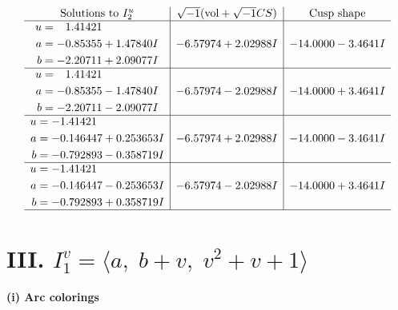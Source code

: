 \documentclass[1p]{elsarticle_modified}
\theoremstyle{definition}
\newcommand{\I}{\sqrt{-1}}
\begin{document}
$$\begin{array}{c|c|c}  
\text{Solutions to }I^u_{2}& \I (\text{vol} + \sqrt{-1}CS) & \text{Cusp shape}\\
 \hline 
\begin{aligned}
u &= \phantom{-}1.41421\phantom{ +0.000000I} \\
a &= -0.85355 + 1.47840 I \\
b &= -2.20711 + 2.09077 I\end{aligned}
 & -6.57974 + 2.02988 I & -14.0000 - 3.4641 I \\ \hline\begin{aligned}
u &= \phantom{-}1.41421\phantom{ +0.000000I} \\
a &= -0.85355 - 1.47840 I \\
b &= -2.20711 - 2.09077 I\end{aligned}
 & -6.57974 - 2.02988 I & -14.0000 + 3.4641 I \\ \hline\begin{aligned}
u &= -1.41421\phantom{ +0.000000I} \\
a &= -0.146447 + 0.253653 I \\
b &= -0.792893 - 0.358719 I\end{aligned}
 & -6.57974 + 2.02988 I & -14.0000 - 3.4641 I \\ \hline\begin{aligned}
u &= -1.41421\phantom{ +0.000000I} \\
a &= -0.146447 - 0.253653 I \\
b &= -0.792893 + 0.358719 I\end{aligned}
 & -6.57974 - 2.02988 I & -14.0000 + 3.4641 I\\
 \hline 
 \end{array}$$\newpage\newpage\renewcommand{\arraystretch}{1}
\centering \section*{III. $I^v_{1}= \langle a,\;b+v,\;v^2+v+1 \rangle$}
\flushleft \textbf{(i) Arc colorings}\\
\end{document}
